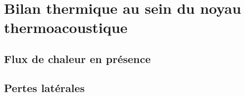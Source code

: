 \chapter{Bilan thermique au sein du noyau thermoacoustique}

\section{Flux de chaleur en présence}

\section{Pertes latérales}

